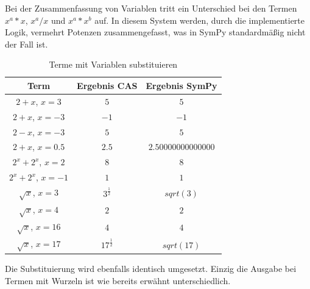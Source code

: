 \documentclass[11pt,a4paper, ngerman]{article}
\begin{document}
Bei der Zusammenfassung von Variablen tritt ein Unterschied bei den Termen $x^a*x$, $x^a/x$ und $x^a*x^b$ auf. In diesem System werden, durch die implementierte Logik, vermehrt Potenzen zusammengefasst, was in SymPy standardmäßig nicht der Fall ist.

\begin{table}[ht!]
    \caption{Terme mit Variablen substituieren}
    \centering
    \begin{tabular}{|c|c|c|}
        \hline
        \textbf{Term} & \textbf{Ergebnis CAS} & \textbf{Ergebnis SymPy} \\
        \hline
        $2+x$, $x=3$ & $5$ & $5$ \\
        \hline
        $2+x$, $x=-3$ & $-1$ & $-1$ \\
        \hline
        $2-x$, $x=-3$ & $5$ & $5$ \\
        \hline
        $2+x$, $x=0.5$ & $2.5$ & $2.50000000000000$ \\
        \hline
        $2^{x} + 2^{x}$, $x=2$ & $8$ & $8$ \\
        \hline
        $2^{x} + 2^{x}$, $x=-1$ & $1$ & $1$ \\
        \hline
        $\sqrt{x}$, $x=3$ & $3^{\frac{1}{2}}$ & $sqrt(3)$ \\
        \hline
        $\sqrt{x}$, $x=4$ & $2$ & $2$ \\
        \hline
        $\sqrt{x}$, $x=16$ & $4$ & $4$ \\
        \hline
        $\sqrt{x}$, $x=17$ & $17^{\frac{1}{2}}$ & $sqrt(17)$ \\
        \hline
    \end{tabular}
\end{table}

Die Substituierung wird ebenfalls identisch umgesetzt. Einzig die Ausgabe bei Termen mit Wurzeln ist wie bereits erwähnt unterschiedlich.

\newpage
\end{document}
